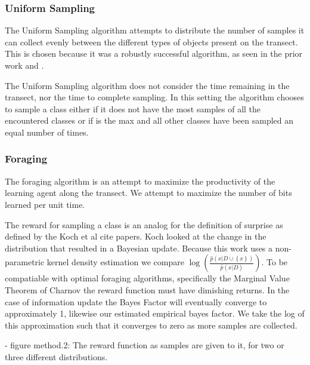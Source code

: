 \subsubsection{Uniform Sampling}

The Uniform Sampling algorithm attempts to distribute the number of samples it
can collect evenly between the different types of objects present on the
transect.  This is chosen because it was a robustly successful algorithm, as
seen in the prior work \cite{furlong2014sequential} and \cite{furlong2014budgeting}.

The Uniform Sampling algorithm does not consider the time remaining in the
transect, nor the time to complete sampling.  In this setting the algorithm
chooses to sample a class either if it does not have the most samples of all
the encountered classes or if is the max and all other classes have been
sampled an equal number of times.

\subsubsection{Foraging}

The foraging algorithm is an attempt to maximize the productivity of the learning agent along the transect.  We attempt to maximize the number of bits learned per unit time.

The reward for sampling a class is an analog for the definition of surprise as
defined by the Koch et al {cite papers}.  Koch looked at the change in the
distribution that resulted in a Bayesian update.  Because this work uses a
non-parametric kernel density estimation we compare
$\log\left(\frac{\hat{p}(x|D\cup \left\{x\right\})}{\hat{p}(x|D)}\right)$.  To
be compatiable with optimal foraging algorithms, specifically the Marginal
Value Theorem of Charnov \cite{charnov1973optimal} the reward function must
have dimishing returns.  In the case of information update the Bayes Factor
will eventually converge to approximately 1, likewise our estimated empirical
bayes factor.  We take the log of this approximation such that it converges to
zero as more samples are collected.


	- figure method.2: The reward function as samples are given to it, for two or three different distributions.

